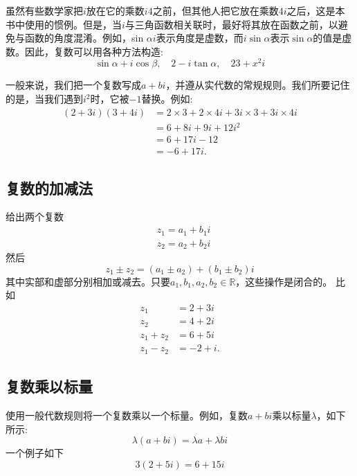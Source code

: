 虽然有些数学家把$i$放在它的乘数$i 4$之前，但其他人把它放在乘数$4 i$之后，这是本书中使用的惯例。但是，当$i$与三角函数相关联时，最好将其放在函数之前，以避免与函数的角度混淆。例如，sin $\alpha i$表示角度是虚数，而$i \sin \alpha$表示$\sin \alpha$的值是虚数。因此，复数可以用各种方法构造:
$$
\sin \alpha+i \cos \beta, \quad 2-i \tan \alpha, \quad 23+x^{2} i
$$

一般来说，我们把一个复数写成$a+b i$，并遵从实代数的常规规则。我们所要记住的是，当我们遇到$i^{2}$时，它被$-1$替换。例如:
$$
\begin{aligned}
(2+3 i)(3+4 i) & =2 \times 3+2 \times 4 i+3 i \times 3+3 i \times 4 i \\
& =6+8 i+9 i+12 i^{2} \\
& =6+17 i-12 \\
& =-6+17 i .
\end{aligned}
$$

\subsection{复数的加减法}
给出两个复数
$$
\begin{aligned}
& z_{1}=a_{1}+b_{1} i \\
& z_{2}=a_{2}+b_{2} i
\end{aligned}
$$
然后
$$
z_{1} \pm z_{2}=\left(a_{1} \pm a_{2}\right)+\left(b_{1} \pm b_{2}\right) i
$$
其中实部和虚部分别相加或减去。只要$a_{1}, b_{1}, a_{2}, b_{2} \in \mathbb{R}$，这些操作是闭合的。
比如
$$
\begin{aligned}
z_{1} & =2+3 i \\
z_{2} & =4+2 i \\
z_{1}+z_{2} & =6+5 i \\
z_{1}-z_{2} & =-2+i .
\end{aligned}
$$

\subsection{复数乘以标量}
使用一般代数规则将一个复数乘以一个标量。例如，复数$a+b i$乘以标量$\lambda$，如下所示:
$$
\lambda(a+b i)=\lambda a+\lambda b i
$$
一个例子如下
$$
3(2+5 i)=6+15 i
$$

